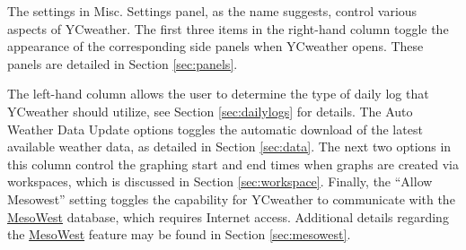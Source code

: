 The settings in Misc. Settings panel, as the name suggests,  control various aspects of YCweather.  The first three items in the right-hand column toggle the appearance of the corresponding side panels when YCweather opens.  These panels are detailed in Section \ref{sec:panels}. 

The left-hand column allows the user to determine the type of daily log that YCweather should utilize, see Section \ref{sec:dailylogs} for details.  The Auto Weather Data Update options toggles the automatic download of the latest available weather data, as detailed in Section \ref{sec:data}.  The next  two options in this column control the graphing start and end times when graphs are created via workspaces, which is discussed in Section \ref{sec:workspace}. Finally, the ``Allow Mesowest'' setting toggles the capability for YCweather to communicate with the \href{http://mesowest.utah.edu/index.html}{MesoWest} database, which requires Internet access. Additional details regarding the \href{http://mesowest.utah.edu/index.html}{MesoWest} feature may be found in Section \ref{sec:mesowest}.
